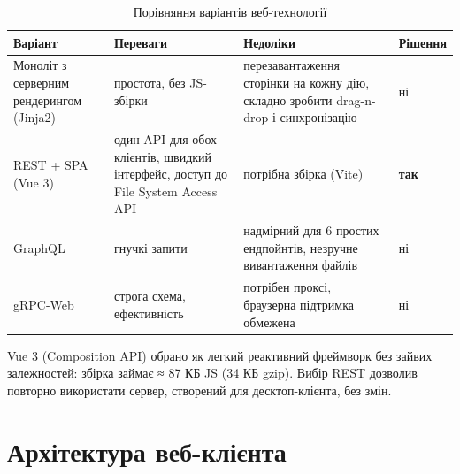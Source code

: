 \documentclass[12pt,a4paper]{article}
\begin{document}
{\small
\begin{longtable}{@{}p{3.6cm}p{4.2cm}p{5.4cm}p{2.0cm}@{}}
\caption{Порівняння варіантів веб-технології}\\
\toprule
\textbf{Варіант} & \textbf{Переваги} & \textbf{Недоліки} & \textbf{Рішення} \\
\midrule
\endhead
Моноліт з серверним рендерингом (Jinja2) & простота, без JS-збірки & перезавантаження сторінки на кожну дію, складно зробити drag-n-drop і синхронізацію & ні \\ \midrule
REST + SPA (Vue 3) & один API для обох клієнтів, швидкий інтерфейс, доступ до File System Access API & потрібна збірка (Vite) & \textbf{так} \\ \midrule
GraphQL & гнучкі запити & надмірний для 6 простих ендпойнтів, незручне вивантаження файлів & ні \\ \midrule
gRPC-Web & строга схема, ефективність & потрібен проксі, браузерна підтримка обмежена & ні \\ \midrule
\bottomrule
\end{longtable}}

Vue 3 (Composition API) обрано як легкий реактивний фреймворк без зайвих залежностей: збірка займає ≈ 87 КБ JS (34 КБ gzip). Вибір REST дозволив повторно використати сервер, створений для десктоп-клієнта, без змін.


\section{Архітектура веб-клієнта}
\end{document}
